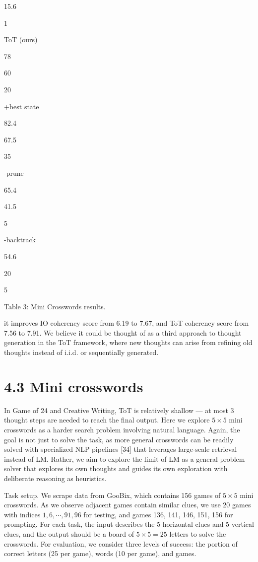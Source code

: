 \documentclass[
]{article}
\begin{document}
15.6

1

ToT (ours)

78

60

20

+best state

82.4

67.5

35

-prune

65.4

41.5

5

-backtrack

54.6

20

5

Table 3: Mini Crosswords results.

it improves IO coherency score from 6.19 to 7.67, and ToT coherency
score from 7.56 to 7.91. We believe it could be thought of as a third
approach to thought generation in the ToT framework, where new thoughts
can arise from refining old thoughts instead of i.i.d. or sequentially
generated.

\section{4.3 Mini crosswords}\label{mini-crosswords}

In Game of 24 and Creative Writing, ToT is relatively shallow --- at
most 3 thought steps are needed to reach the final output. Here we
explore \(5 \times 5\) mini crosswords as a harder search problem
involving natural language. Again, the goal is not just to solve the
task, as more general crosswords can be readily solved with specialized
NLP pipelines {[}34{]} that leverages large-scale retrieval instead of
LM. Rather, we aim to explore the limit of LM as a general problem
solver that explores its own thoughts and guides its own exploration
with deliberate reasoning as heuristics.

Task setup. We scrape data from GooBix, which contains 156 games of
\(5 \times 5\) mini crosswords. As we observe adjacent games contain
similar clues, we use 20 games with indices \(1, 6, \cdots, 91, 96\) for
testing, and games 136, 141, 146, 151, 156 for prompting. For each task,
the input describes the 5 horizontal clues and 5 vertical clues, and the
output should be a board of \(5 \times 5 = 25\) letters to solve the
crosswords. For evaluation, we consider three levels of success: the
portion of correct letters (25 per game), words (10 per game), and
games.
\end{document}
